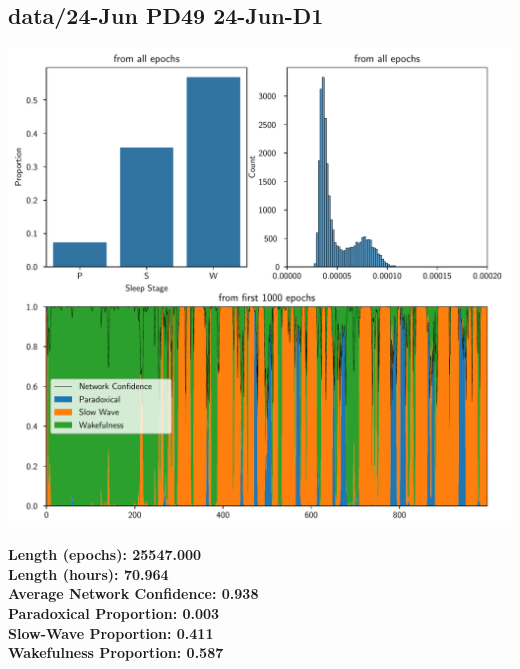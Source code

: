         \subsection*{ data/24-Jun PD49 24-Jun-D1 }
        \begin{center}
        \begin{adjustbox}{width=1\textwidth}
        \includegraphics[page=3]{figs.pdf}
        \end{adjustbox}
        \end{center}
        \large\textbf{Length (epochs): 25547.000}\\
        \textbf{Length (hours): 70.964}\\
        \textbf{Average Network Confidence: 0.938}\\
        \textbf{Paradoxical Proportion: 0.003}\\
        \textbf{Slow-Wave Proportion: 0.411}\\
        \textbf{Wakefulness Proportion: 0.587}\\
        
